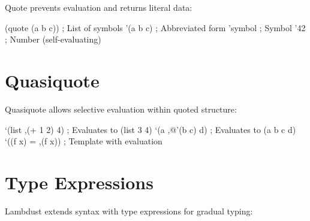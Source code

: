 Quote prevents evaluation and returns literal data:

\begin{grammar}
\end{grammar}

\begin{example}[Quotation]
\begin{lambdustcode}
(quote (a b c))     ; List of symbols
'(a b c)            ; Abbreviated form
'symbol             ; Symbol  
'42                 ; Number (self-evaluating)
\end{lambdustcode}
\end{example}

\section{Quasiquote}
\label{sec:quasiquote}

Quasiquote allows selective evaluation within quoted structure:

\begin{grammar}
\end{grammar}

\begin{example}[Quasiquotation]
\begin{lambdustcode}
`(list ,(+ 1 2) 4)          ; Evaluates to (list 3 4)
`(a ,@'(b c) d)             ; Evaluates to (a b c d)
`((f x) = ,(f x))           ; Template with evaluation
\end{lambdustcode}
\end{example}

\section{Type Expressions}
\label{sec:type-expressions}


Lambdust extends syntax with type expressions for gradual typing:

